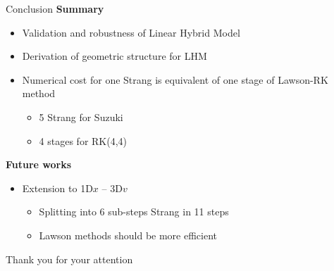 \documentclass{beamer}
\newcommand{\arrow}{{\color{PLB}\ding{220}}}
\newcommand{\mbold}[1]{{\textbf{\color{PLB}#1}}}
\begin{document}
\begin{frame}{Conclusion}
  \mbold{Summary}
  \begin{itemize}
    \item Validation and robustness of Linear Hybrid Model
    \item Derivation of geometric structure for LHM
    \item Numerical cost for one Strang is equivalent of one stage of Lawson-RK method \begin{itemize}
        \item 5 Strang for Suzuki
        \item 4 stages for RK(4,4)
      \end{itemize}
  \end{itemize}

  \mbold{Future works}
  \begin{itemize}
    \item Extension to 1D$x$ -- 3D$v$ \begin{itemize}
      \item Splitting into 6 sub-steps \arrow Strang in 11 steps
      \item Lawson methods should be more efficient
    \end{itemize}
  \end{itemize}
\end{frame}

\begin{frame}[t]
  \vfill
  { Thank you for your attention}
  \vfill
\end{frame}
\end{document}
